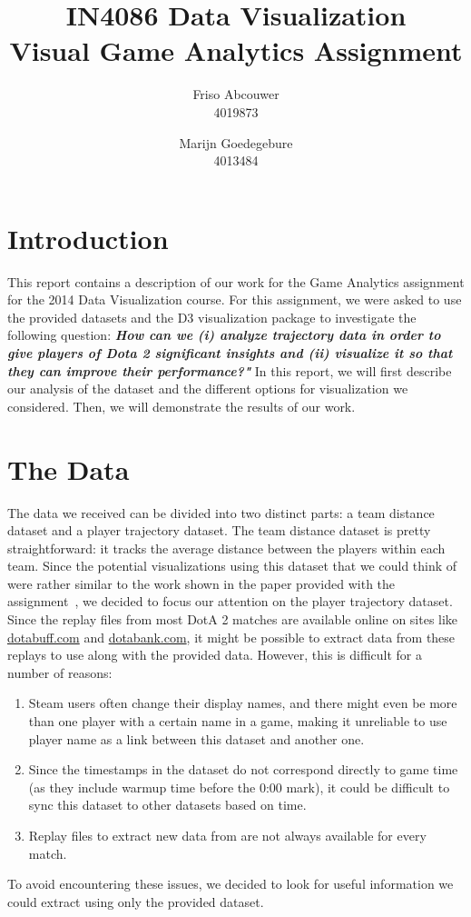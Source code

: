 \documentclass[a4paper,11pt]{article}
\title{IN4086 Data Visualization \\
Visual Game Analytics Assignment \\ }
\author{
Friso Abcouwer \\
4019873 \\
\and
Marijn Goedegebure \\
4013484
}
\begin{document}
\maketitle{}
\newpage

\section{Introduction}
This report contains a description of our work for the Game Analytics assignment for the 2014 Data Visualization course.
For this assignment, we were asked to use the provided datasets and the D3 visualization package to investigate the following question: \textbf{\textit{How can we (i) analyze trajectory data in order to give players of Dota 2 significant insights and (ii) visualize it so that they can improve their performance?"}}
In this report, we will first describe our analysis of the dataset and the different options for visualization we considered. Then, we will demonstrate the results of our work.

\section{The Data}
The data we received can be divided into two distinct parts: a team distance dataset and a player trajectory dataset.
The team distance dataset is pretty straightforward: it tracks the average distance between the players within each team.
Since the potential visualizations using this dataset that we could think of were rather similar to the work shown in the paper provided with the assignment~\cite{drachenskill}, we decided to focus our attention on the player trajectory dataset.\\

Since the replay files from most DotA 2 matches are available online on sites like \url{dotabuff.com} and \url{dotabank.com}, it might be possible to extract data from these replays to use along with the provided data. However, this is difficult for a number of reasons:
\begin{enumerate}
\item Steam users often change their display names, and there might even be more than one player with a certain name in a game, making it unreliable to use player name as a link between this dataset and another one.
\item Since the timestamps in the dataset do not correspond directly to game time (as they include warmup time before the 0:00 mark), it could be difficult to sync this dataset to other datasets based on time.
\item Replay files to extract new data from are not always available for every match.
\end{enumerate}
To avoid encountering these issues, we decided to look for useful information we could extract using only the provided dataset.
\end{document}
